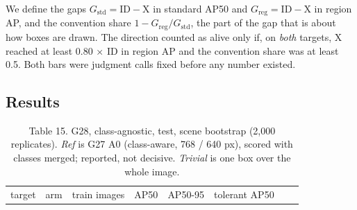 \documentclass[
  10pt,
]{article}
\begin{document}
We define the gaps \(G_{\mathrm{std}} = \mathrm{ID} - \mathrm{X}\) in
standard AP50 and \(G_{\mathrm{reg}} = \mathrm{ID} - \mathrm{X}\) in
region AP, and the convention share
\(1 - G_{\mathrm{reg}} / G_{\mathrm{std}}\), the part of the gap that is
about how boxes are drawn. The direction counted as alive only if, on
\emph{both} targets, X reached at least 0.80 × ID in region AP and the
convention share was at least 0.5. Both bars were judgment calls fixed
before any number existed.

\subsection{Results}\label{results}

\begin{longtable}[]{@{}
  >{\raggedright\arraybackslash}p{}
  >{\raggedright\arraybackslash}p{}
  >{\raggedright\arraybackslash}p{}
  >{\raggedright\arraybackslash}p{}
  >{\raggedright\arraybackslash}p{}
  >{\raggedright\arraybackslash}p{}
  >{\raggedright\arraybackslash}p{}
  >{\raggedright\arraybackslash}p{}@{}}
\caption{Table 15. G28, class-agnostic, test, scene bootstrap (2,000
replicates). \emph{Ref} is G27 A0 (class-aware, 768 / 640 px), scored
with classes merged; reported, not decisive. \emph{Trivial} is one box
over the whole image.}\tabularnewline
\toprule\noalign{}
\begin{minipage}[b]{\linewidth}\raggedright
target
\end{minipage} & \begin{minipage}[b]{\linewidth}\raggedright
arm
\end{minipage} & \begin{minipage}[b]{\linewidth}\raggedright
train images
\end{minipage} & \begin{minipage}[b]{\linewidth}\raggedright
AP50
\end{minipage} & \begin{minipage}[b]{\linewidth}\raggedright
AP50-95
\end{minipage} & \begin{minipage}[b]{\linewidth}\raggedright
tolerant AP50
\end{minipage} & \begin{minipage}[b]{\linewidth}\raggedright

\end{minipage}
\end{longtable}
\end{document}
